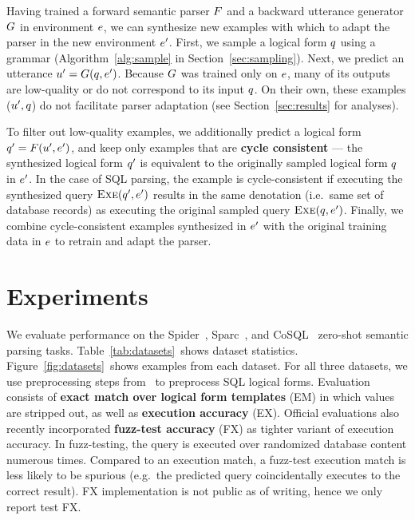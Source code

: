 \documentclass[11pt,a4paper]{article}
\begin{document}
Having trained a forward semantic parser ${F}$ and a backward utterance generator ${G}$ in environment ${e}$, we can synthesize new examples with which to adapt the parser in the new environment ${{e}^\prime}$.
First, we sample a logical form ${q}$ using a grammar (Algorithm~\ref{alg:sample} in Section~\ref{sec:sampling}).
Next, we predict an utterance ${{u}^\prime} = {G}({q}, {{e}^\prime})$.
Because ${G}$ was trained only on ${e}$, many of its outputs are low-quality or do not correspond to its input ${q}$.
On their own, these examples (${{u}^\prime}, {q}$) do not facilitate parser adaptation (see Section~\ref{sec:results} for analyses).




To filter out low-quality examples, we additionally predict a logical form ${{q}^\prime} = {F}({{u}^\prime}, {{e}^\prime})$, and keep only examples that are \textbf{cycle consistent} --- the synthesized logical form ${{q}^\prime}$ is equivalent to the originally sampled logical form ${q}$ in ${{e}^\prime}$.
In the case of SQL parsing, the example is cycle-consistent if executing the synthesized query ${\textsf{\textsc{Exe}}({{q}^\prime}, {{e}^\prime})}$ results in the same denotation (i.e.~same set of database records) as executing the original sampled query ${\textsf{\textsc{Exe}}({q}, {{e}^\prime})}$.
Finally, we combine cycle-consistent examples synthesized in ${{e}^\prime}$ with the original training data in ${e}$ to retrain and adapt the parser.





\section{Experiments}
\label{sec:experiments}


We evaluate performance on the Spider~\citep{yu2018spider}, Sparc~\citep{yu2019sparc}, and CoSQL~\citep{yu2019cosql} zero-shot semantic parsing tasks.
Table~\ref{tab:datasets}~shows dataset statistics.
Figure~\ref{fig:datasets}~shows examples from each dataset.
For all three datasets, we use preprocessing steps from~\citet{zhang2019editing} to preprocess SQL logical forms.
Evaluation consists of \textbf{exact match over logical form templates} (EM) in which values are stripped out, as well as \textbf{execution accuracy} (EX).
Official evaluations also recently incorporated \textbf{fuzz-test accuracy} (FX) as tighter variant of execution accuracy.
In fuzz-testing, the query is executed over randomized database content numerous times.
Compared to an execution match, a fuzz-test execution match is less likely to be spurious (e.g.~the predicted query coincidentally executes to the correct result).
FX implementation is not public as of writing, hence we only report test FX.
\end{document}
